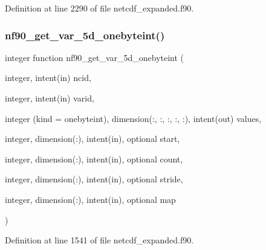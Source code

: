 Definition at line 2290 of file netcdf\+\_\+expanded.\+f90.

\mbox{\label{netcdf__expanded_8f90_a762baa41523cbb59f966d15826c09825}} 
\subsubsection{\texorpdfstring{nf90\+\_\+get\+\_\+var\+\_\+5d\+\_\+onebyteint()}{nf90\_get\_var\_5d\_onebyteint()}}
{\footnotesize\ttfamily integer function nf90\+\_\+get\+\_\+var\+\_\+5d\+\_\+onebyteint (\begin{DoxyParamCaption}\item[{integer, intent(in)}]{ncid,  }\item[{integer, intent(in)}]{varid,  }\item[{integer (kind = onebyteint), dimension(\+:, \+:, \+:, \+:, \+:), intent(out)}]{values,  }\item[{integer, dimension(\+:), intent(in), optional}]{start,  }\item[{integer, dimension(\+:), intent(in), optional}]{count,  }\item[{integer, dimension(\+:), intent(in), optional}]{stride,  }\item[{integer, dimension(\+:), intent(in), optional}]{map }\end{DoxyParamCaption})}



Definition at line 1541 of file netcdf\+\_\+expanded.\+f90.

\mbox{\label{netcdf__expanded_8f90_a5c91959cc4284de5268ad7ddd7b14d01}} 
